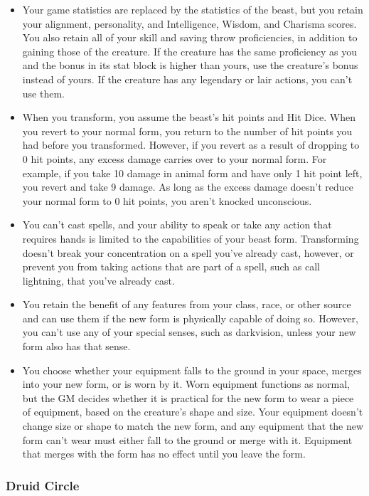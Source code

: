 \documentclass[
]{article}
\providecommand{\tightlist}{%
  \setlength{\itemsep}{0pt}\setlength{\parskip}{0pt}}
\begin{document}
\begin{itemize}
\tightlist
\item
  Your game statistics are replaced by the statistics of the beast, but
  you retain your alignment, personality, and Intelligence, Wisdom, and
  Charisma scores. You also retain all of your skill and saving throw
  proficiencies, in addition to gaining those of the creature. If the
  creature has the same proficiency as you and the bonus in its stat
  block is higher than yours, use the creature's bonus instead of yours.
  If the creature has any legendary or lair actions, you can't use them.
\item
  When you transform, you assume the beast's hit points and Hit Dice.
  When you revert to your normal form, you return to the number of hit
  points you had before you transformed. However, if you revert as a
  result of dropping to 0 hit points, any excess damage carries over to
  your normal form. For example, if you take 10 damage in animal form
  and have only 1 hit point left, you revert and take 9 damage. As long
  as the excess damage doesn't reduce your normal form to 0 hit points,
  you aren't knocked unconscious.
\item
  You can't cast spells, and your ability to speak or take any action
  that requires hands is limited to the capabilities of your beast form.
  Transforming doesn't break your concentration on a spell you've
  already cast, however, or prevent you from taking actions that are
  part of a spell, such as call lightning, that you've already cast.
\item
  You retain the benefit of any features from your class, race, or other
  source and can use them if the new form is physically capable of doing
  so. However, you can't use any of your special senses, such as
  darkvision, unless your new form also has that sense.
\item
  You choose whether your equipment falls to the ground in your space,
  merges into your new form, or is worn by it. Worn equipment functions
  as normal, but the GM decides whether it is practical for the new form
  to wear a piece of equipment, based on the creature's shape and size.
  Your equipment doesn't change size or shape to match the new form, and
  any equipment that the new form can't wear must either fall to the
  ground or merge with it. Equipment that merges with the form has no
  effect until you leave the form.
\end{itemize}

\hypertarget{druid-circle}{%
\subsubsection{Druid Circle}\label{druid-circle}}
\end{document}
